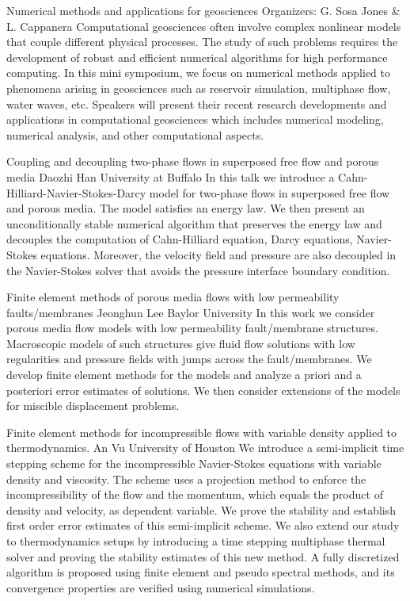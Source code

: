 \label{mini13}

\miniabs
{Numerical methods and applications for geosciences}
{Organizers: G. Sosa Jones \& L. Cappanera}
{Computational geosciences often involve complex nonlinear models that couple different physical processes. The study of such problems requires the development of robust and efficient numerical algorithms for high performance computing. In this mini symposium, we focus on numerical methods applied to phenomena arising in geosciences such as reservoir simulation, multiphase flow, water waves, etc. Speakers will present their recent research developments and applications in computational geosciences which includes numerical modeling, numerical analysis, and other computational aspects.}

\begin{addmargin}[2em]{0em}
\vspace{2ex}
\abs
{Coupling and decoupling two-phase flows in superposed free flow and porous media}
{Daozhi Han}
{University at Buffalo}
{In this talk we introduce a Cahn-Hilliard-Navier-Stokes-Darcy model for two-phase flows in superposed free flow and porous media. The model satisfies an energy law. We then present an unconditionally stable numerical algorithm that preserves the energy law and decouples the computation of Cahn-Hilliard equation, Darcy equations, Navier-Stokes equations. Moreover, the velocity field and pressure are also decoupled in the Navier-Stokes solver that avoids the pressure interface boundary condition.}


\vspace{1.5ex}
\abs
{Finite element methods of porous media flows with low permeability faults/membranes}
{Jeonghun Lee}
{Baylor University}
{In this work we consider porous media flow models with low permeability fault/membrane structures.
Macroscopic models of such structures give fluid flow solutions with low regularities and pressure fields with jumps across the fault/membranes. We develop finite element methods for the models and analyze a priori and a posteriori error estimates of solutions. We then consider extensions of the models for miscible displacement problems.}


\vspace{1.5ex}
\abs
{Finite element methods for incompressible flows with variable density applied to thermodynamics.}
{An Vu}
{University of Houston}
{We introduce a semi-implicit time stepping scheme for the incompressible Navier-Stokes equations with variable density and viscosity. The scheme uses a projection method to enforce the incompressibility of the flow and the momentum, which equals the product of density and velocity, as dependent variable. We prove the stability and establish first order error estimates of this semi-implicit scheme. We also extend our study to thermodynamics setups by introducing a time stepping multiphase thermal solver and proving the stability estimates of this new method. A fully discretized algorithm is proposed using finite element and pseudo spectral methods, and its convergence properties are verified using numerical simulations.}



\end{addmargin}
